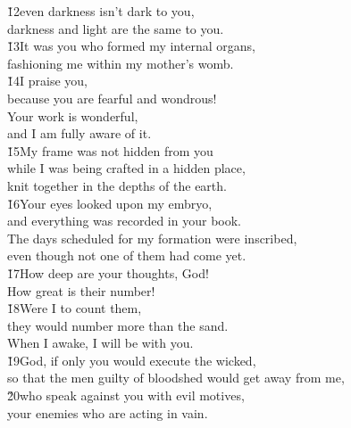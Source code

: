 \begin{poetry}
\poeml \v{12}even darkness isn't dark to you, \\
\poemll    darkness and light are the same to you. \\
\poeml \v{13}It was you who formed my internal organs, \\
\poemll    fashioning me within my mother's womb. \\
\poeml \v{14}I praise you, \\
\poemll    because you are fearful and wondrous! \\
\poeml Your work is wonderful, \\
\poemll    and I am fully aware of it. \\
\poeml \v{15}My frame was not hidden from you \\
\poemll    while I was being crafted in a hidden place, \\
\poemlll       knit together in the depths of the earth. \\
\poeml \v{16}Your eyes looked upon my embryo, \\
\poemll    and everything was recorded in your book. \\
\poeml The days scheduled for my formation were inscribed, \\
\poemll    even though not one of them had come yet. \\
\poeml \v{17}How deep are your thoughts, God! \\
\poemll    How great is their number! \\
\poeml \v{18}Were I to count them, \\
\poemll    they would number more than the sand. \\
\poemlll       When I awake, I will be with you. \\
\poeml \v{19}God, if only you would execute the wicked, \\
\poemll    so that the men guilty of bloodshed would get away from me, \\
\poeml \v{20}who speak against you with evil motives, \\
\poemll    your enemies who are acting in vain. \\

\end{poetry}
